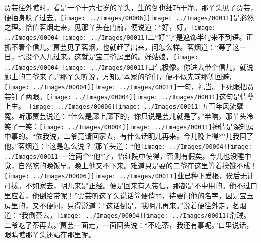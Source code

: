 贾芸往外瞧时，看是一个十六七岁的丫头，生的倒也细巧干净。那丫头见了贾芸，便抽身躲了过去。{\texttt{[image: ../Images/00006]}\texttt{[image: ../Images/00011]}\footnotesize \kaishu 是必然之理。}恰值茗烟走来，见那丫头在门前，便说道：``好，好，{\texttt{[image: ../Images/00004]}\texttt{[image: ../Images/00011]}\footnotesize \kaishu 二``好''字是遮饰半句来不到语。}正抓不着个信儿。''贾芸见了茗烟，也就赶了出来，问怎么样。茗烟道：``等了这一日，也没个人儿过来。这就是宝二爷房里的。好姑娘，{\texttt{[image: ../Images/00004]}\texttt{[image: ../Images/00011]}\footnotesize \kaishu 口气极像。}你进去带个信儿，就说廊上的二爷来了。''那丫头听说，方知是本家的爷们，便不似先前那等回避，{\texttt{[image: ../Images/00004]}\texttt{[image: ../Images/00011]}\footnotesize \kaishu 一句，礼当。}下死眼把贾芸钉了两眼。{{\texttt{[image: ../Images/00004]}\texttt{[image: ../Images/00011]}\footnotesize \kaishu 这句是情孽上生。　}\texttt{[image: ../Images/00006]}\texttt{[image: ../Images/00011]}\footnotesize \kaishu 五百年风流孽冤。}听那贾芸说道：``什么是廊上廊下的，你只说是芸儿就是了。''半晌，那丫头冷笑了一笑：{\texttt{[image: ../Images/00004]}\texttt{[image: ../Images/00011]}\footnotesize \kaishu 神情是深知房中事的。}``依我说，二爷竟请回家去，有什么话明儿再来。今儿晚上得空儿我回了他。''茗烟道：``这是怎么说？''那丫头道：``他{\texttt{[image: ../Images/00004]}\texttt{[image: ../Images/00011]}\footnotesize \kaishu 一连两个``他''字，怡红院中使得，否则有假矣。}今儿也没睡中觉，自然吃的晚饭早。晚上他又不下来。难道只是耍的二爷在这里等着挨饿不成！{\texttt{[image: ../Images/00006]}\texttt{[image: ../Images/00011]}\footnotesize \kaishu 业已种下爱根，俟后无计可拔。}不如家去，明儿来是正经。便是回来有人带信，那都是不中用的。他不过口里应着，他倒给带呢！''贾芸听这丫头说话简便俏丽，待要问他的名字，因是宝玉房里的，又不便问，只得说道：``这话倒是，我明儿再来。''说着便往外走。茗烟道：``我倒茶去，{\texttt{[image: ../Images/00004]}\texttt{[image: ../Images/00011]}\footnotesize \kaishu 滑贼。}二爷吃了茶再去。''贾芸一面走，一面回头说：``不吃茶，我还有事呢。''口里说话，眼睛瞧那丫头还站在那里呢。

